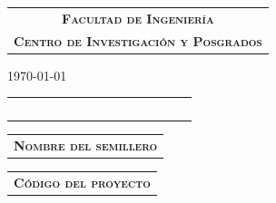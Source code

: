 \documentclass[12pt]{report}
\newcommand\tope{100}
\begin{document}
{\begin{minipage}{\textwidth}
{\begin{minipage}{0.7\textwidth}
\begin{center}
\begin{tabular}{c}
\begin{minipage}[t]{0.95\columnwidth}
							\centering
							\textsc{\textbf{Facultad de Ingeniería}}                      
						\end{minipage}
						\vspace{0.2cm}\\
						\begin{minipage}[t]{0.95\columnwidth}%
							\centering
							\textsc{\textbf{Centro de Investigación y Posgrados}}                      
						\end{minipage}
					\end{tabular}
				\end{center}
		\end{minipage}}\hspace{0.3cm}%
	\end{minipage}
}

\begin{center}
	\today
\end{center}

\vspace{0.1 cm}


\ifthenelse{\advances < \tope}{\mypageT{\solution}{\wcolor}{\advances}}{\mypageO}
\vspace{0.3 cm}

\begin{minipage}{\textwidth}
	\begin{tabular}{l}
		\begin{minipage}[t]{0.5\textwidth}%
			\cellcolor{blue!70}\textcolor{white}{\textsc{\textbf{Información del proyecto}}}
		\end{minipage}
	\end{tabular}	
\end{minipage}

\begin{minipage}{\textwidth}
	\begin{tabular}{l}
		\begin{minipage}[t]{0.7\textwidth}%
			\cellcolor{blue!10}\textsc{\textbf{Nombre del semillero}}
		\end{minipage}
	\end{tabular}	
	\begin{tabular}{l}
		\begin{minipage}[t]{0.28\textwidth}%
			\centering
			\cellcolor{blue!10}\textsc{\textbf{Código del proyecto}}
		\end{minipage}
	\end{tabular}	
\end{minipage}
\end{document}
